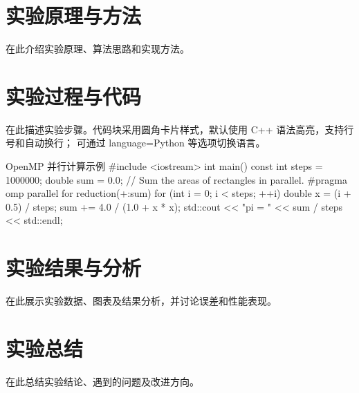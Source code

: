 \documentclass[UTF8,a4paper,fontset=none,zihao=-4]{ctexart}
\begin{document}
\section{实验原理与方法}
在此介绍实验原理、算法思路和实现方法。

\section{实验过程与代码}
在此描述实验步骤。代码块采用圆角卡片样式，默认使用 C++ 语法高亮，支持行号和自动换行；
可通过 language=Python 等选项切换语言。

\begin{reportcode}[language=C++]{OpenMP 并行计算示例}
#include <iostream>
int main() {
    const int steps = 1000000; double sum = 0.0;
    // Sum the areas of rectangles in parallel.
    #pragma omp parallel for reduction(+:sum)
    for (int i = 0; i < steps; ++i) {
        double x = (i + 0.5) / steps;
        sum += 4.0 / (1.0 + x * x);
    }
    std::cout << "pi = " << sum / steps << std::endl;
}
\end{reportcode}

\section{实验结果与分析}
在此展示实验数据、图表及结果分析，并讨论误差和性能表现。

\section{实验总结}
在此总结实验结论、遇到的问题及改进方向。
\end{document}
